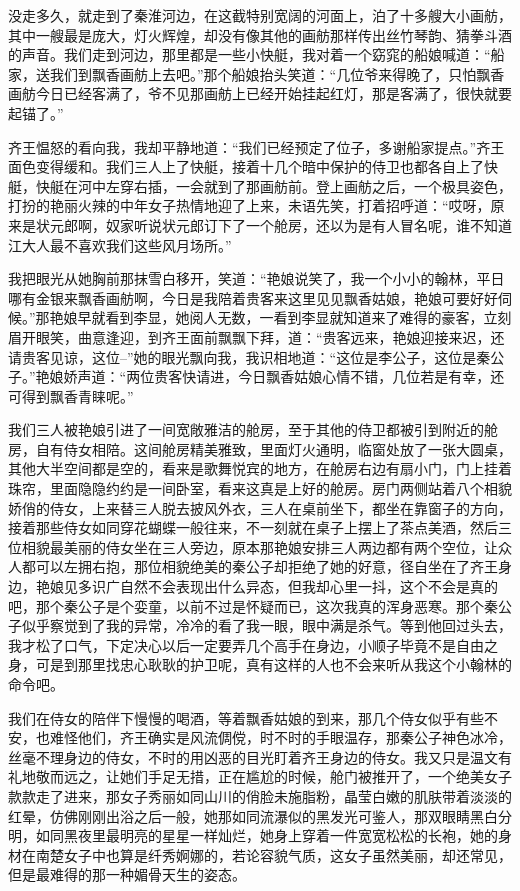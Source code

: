 没走多久，就走到了秦淮河边，在这截特别宽阔的河面上，泊了十多艘大小画舫，其中一艘最是庞大，灯火辉煌，却没有像其他的画舫那样传出丝竹琴韵、猜拳斗酒的声音。我们走到河边，那里都是一些小快艇，我对着一个窈窕的船娘喊道：“船家，送我们到飘香画舫上去吧。”那个船娘抬头笑道：“几位爷来得晚了，只怕飘香画舫今日已经客满了，爷不见那画舫上已经开始挂起红灯，那是客满了，很快就要起锚了。”

齐王愠怒的看向我，我却平静地道：“我们已经预定了位子，多谢船家提点。”齐王面色变得缓和。我们三人上了快艇，接着十几个暗中保护的侍卫也都各自上了快艇，快艇在河中左穿右插，一会就到了那画舫前。登上画舫之后，一个极具姿色，打扮的艳丽火辣的中年女子热情地迎了上来，未语先笑，打着招呼道：“哎呀，原来是状元郎啊，奴家听说状元郎订下了一个舱房，还以为是有人冒名呢，谁不知道江大人最不喜欢我们这些风月场所。”

我把眼光从她胸前那抹雪白移开，笑道：“艳娘说笑了，我一个小小的翰林，平日哪有金银来飘香画舫啊，今日是我陪着贵客来这里见见飘香姑娘，艳娘可要好好伺候。”那艳娘早就看到李显，她阅人无数，一看到李显就知道来了难得的豪客，立刻眉开眼笑，曲意逢迎，到齐王面前飘飘下拜，道：“贵客远来，艳娘迎接来迟，还请贵客见谅，这位--”她的眼光飘向我，我识相地道：“这位是李公子，这位是秦公子。”艳娘娇声道：“两位贵客快请进，今日飘香姑娘心情不错，几位若是有幸，还可得到飘香青睐呢。”

我们三人被艳娘引进了一间宽敞雅洁的舱房，至于其他的侍卫都被引到附近的舱房，自有侍女相陪。这间舱房精美雅致，里面灯火通明，临窗处放了一张大圆桌，其他大半空间都是空的，看来是歌舞悦宾的地方，在舱房右边有扇小门，门上挂着珠帘，里面隐隐约约是一间卧室，看来这真是上好的舱房。房门两侧站着八个相貌娇俏的侍女，上来替三人脱去披风外衣，三人在桌前坐下，都坐在靠窗子的方向，接着那些侍女如同穿花蝴蝶一般往来，不一刻就在桌子上摆上了茶点美酒，然后三位相貌最美丽的侍女坐在三人旁边，原本那艳娘安排三人两边都有两个空位，让众人都可以左拥右抱，那位相貌绝美的秦公子却拒绝了她的好意，径自坐在了齐王身边，艳娘见多识广自然不会表现出什么异态，但我却心里一抖，这个不会是真的吧，那个秦公子是个娈童，以前不过是怀疑而已，这次我真的浑身恶寒。那个秦公子似乎察觉到了我的异常，冷冷的看了我一眼，眼中满是杀气。等到他回过头去，我才松了口气，下定决心以后一定要弄几个高手在身边，小顺子毕竟不是自由之身，可是到那里找忠心耿耿的护卫呢，真有这样的人也不会来听从我这个小翰林的命令吧。

我们在侍女的陪伴下慢慢的喝酒，等着飘香姑娘的到来，那几个侍女似乎有些不安，也难怪他们，齐王确实是风流倜傥，时不时的手眼温存，那秦公子神色冰冷，丝毫不理身边的侍女，不时的用凶恶的目光盯着齐王身边的侍女。我又只是温文有礼地敬而远之，让她们手足无措，正在尴尬的时候，舱门被推开了，一个绝美女子款款走了进来，那女子秀丽如同山川的俏脸未施脂粉，晶莹白嫩的肌肤带着淡淡的红晕，仿佛刚刚出浴之后一般，她那如同流瀑似的黑发光可鉴人，那双眼睛黑白分明，如同黑夜里最明亮的星星一样灿烂，她身上穿着一件宽宽松松的长袍，她的身材在南楚女子中也算是纤秀婀娜的，若论容貌气质，这女子虽然美丽，却还常见，但是最难得的那一种媚骨天生的姿态。

